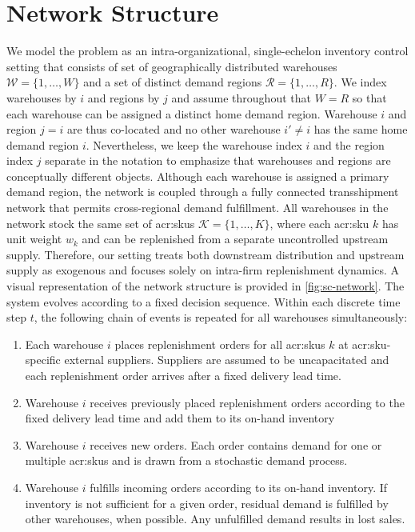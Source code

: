 \section{Network Structure}
\label{sec:network-structure}
We model the problem as an intra-organizational, single-echelon inventory control setting that consists of set of geographically distributed warehouses $\mathcal{W} = \{1, \dots, W\}$ and a set of distinct demand regions $\mathcal{R} = \{1, \dots, R\}$. We index warehouses by $i$ and regions by $j$ and assume throughout that $W=R$ so that each warehouse can be assigned a distinct home demand region. Warehouse $i$ and region $j=i$ are thus co-located and no other warehouse $i'\ne i$ has the same home demand region $i$. Nevertheless, we keep the warehouse index $i$ and the region index $j$ separate in the notation to emphasize that warehouses and regions are conceptually different objects. Although each warehouse is assigned a primary demand region, the network is coupled through a fully connected transshipment network that permits cross-regional demand fulfillment. All warehouses in the network stock the same set of \glspl{acr:sku} $\mathcal{K} = \{1, \dots, K\}$, where each \gls{acr:sku} $k$ has unit weight $w_k$ and can be replenished from a separate uncontrolled upstream supply. Therefore, our setting treats both downstream distribution and upstream supply as exogenous and focuses solely on intra-firm replenishment dynamics. A visual representation of the network structure is provided in \autoref{fig:sc-network}. The system evolves according to a fixed decision sequence. Within each  discrete time step $t$, the following chain of events is repeated for all warehouses simultaneously:\\
\begin{enumerate}[itemsep=4pt, topsep=8pt, parsep=0pt]
  \item Each warehouse $i$ places replenishment orders for all \glspl{acr:sku} $k$ at
  \gls{acr:sku}-specific external suppliers. Suppliers are assumed to be uncapacitated and each replenishment order arrives after a fixed delivery lead time.
  \item Warehouse $i$ receives previously placed replenishment orders according to the fixed delivery lead time and add them to its on-hand inventory
  \item Warehouse $i$ receives new orders. Each order contains demand for one or multiple \glspl{acr:sku} and is drawn from a stochastic demand process.
  \item Warehouse $i$ fulfills incoming orders according to its on-hand inventory. If inventory is not sufficient for a given order, residual demand is fulfilled by other warehouses, when possible. Any unfulfilled demand results in lost sales. 
\end{enumerate}


